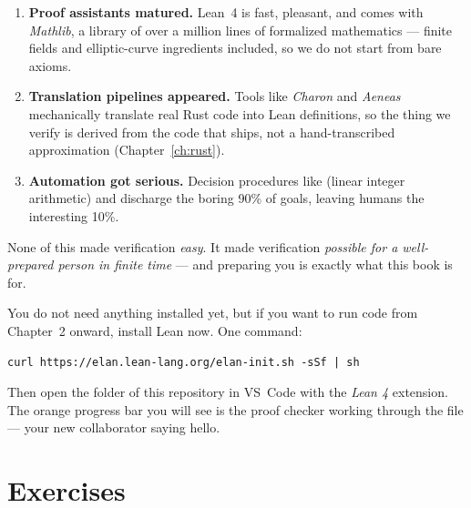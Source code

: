\begin{enumerate}[leftmargin=1.6em]
\item \textbf{Proof assistants matured.} Lean~4 is fast, pleasant, and comes
  with \emph{Mathlib}, a library of over a million lines of formalized
  mathematics --- finite fields and elliptic-curve ingredients included, so we
  do not start from bare axioms.
\item \textbf{Translation pipelines appeared.} Tools like \emph{Charon} and
  \emph{Aeneas} mechanically translate real Rust code into Lean definitions,
  so the thing we verify is derived from the code that ships, not a
  hand-transcribed approximation (Chapter~\ref{ch:rust}).
\item \textbf{Automation got serious.} Decision procedures like 
  (linear integer arithmetic) and  discharge the boring 90\% of
  goals, leaving humans the interesting 10\%.
\end{enumerate}

None of this made verification \emph{easy}. It made verification
\emph{possible for a well-prepared person in finite time} --- and preparing
you is exactly what this book is for.

\begin{tryit}
You do not need anything installed yet, but if you want to run code from
Chapter~2 onward, install Lean now. One command:
\begin{lstlisting}
curl https://elan.lean-lang.org/elan-init.sh -sSf | sh
\end{lstlisting}
Then open the  folder of this repository in VS~Code with the
\emph{Lean 4} extension. The orange progress bar you will see is the proof
checker working through the file --- your new collaborator saying hello.
\end{tryit}

\section*{Exercises}



